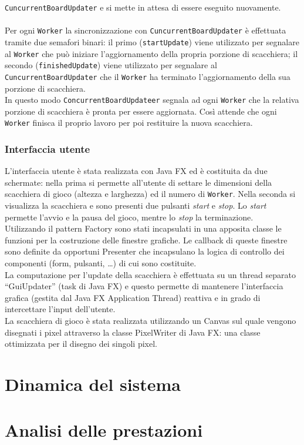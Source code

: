 ﻿\documentclass[a4paper]{article}
\begin{document}
\texttt{CuncurrentBoardUpdater} e si mette in attesa di essere eseguito
nuovamente.\\\\
Per ogni \texttt{Worker} la sincronizzazione con
\texttt{CuncurrentBoardUpdater} è effettuata tramite due semafori
binari: il primo (\texttt{startUpdate}) viene utilizzato per segnalare al \texttt{Worker} che può iniziare l'aggiornamento della propria
porzione di scacchiera; il secondo (\texttt{finishedUpdate}) viene
utilizzato per segnalare al \texttt{CuncurrentBoardUpdater} che il
\texttt{Worker} ha terminato l'aggiornamento della sua porzione di
scacchiera.\\
In questo modo \texttt{ConcurrentBoardUpdateer} segnala ad ogni
\texttt{Worker} che la relativa porzione di scacchiera è pronta per
essere aggiornata. Così attende che ogni \texttt{Worker} finisca il
proprio lavoro per poi restituire la nuova scacchiera.

\subsubsection{Interfaccia utente}\label{interfaccia-utente}

L’interfaccia utente è stata realizzata con Java FX ed è costituita da due schermate: nella prima si permette all’utente di settare le dimensioni della scacchiera di gioco (altezza e larghezza) ed il numero di \texttt{Worker}. Nella seconda si visualizza la scacchiera e sono presenti due pulsanti \emph{start} e \emph{stop}. Lo \emph{start} permette l’avvio e la pausa del gioco, mentre lo \emph{stop} la terminazione.\\
Utilizzando il pattern Factory sono stati incapsulati in una apposita classe le funzioni per la costruzione delle finestre grafiche. Le callback di queste finestre sono definite da opportuni Presenter che incapsulano la logica di controllo dei componenti (form, pulsanti, …) di cui sono costituite.\\
La computazione per l’update della scacchiera è effettuata su un thread separato “GuiUpdater” (task di Java FX) e questo permette di mantenere l’interfaccia grafica (gestita dal Java FX Application Thread) reattiva e in grado di intercettare l’input dell’utente.\\
La scacchiera di gioco è stata realizzata utilizzando un Canvas sul quale vengono disegnati i pixel attraverso la classe PixelWriter di Java FX: una classe ottimizzata per il disegno dei singoli pixel.

\section{Dinamica del sistema}\label{dinamica-del-sistema}

\section{Analisi delle prestazioni}\label{analisi-delle-prestazioni}

\end{document}
